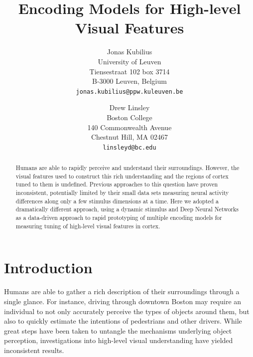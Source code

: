 \documentclass[10pt,twocolumn,letterpaper]{article}
\begin{document}
\title{Encoding Models for High-level Visual Features}

\author{Jonas Kubilius\\
University of Leuven\\
Tiensestraat 102 box 3714\\
B-3000 Leuven, Belgium\\
{\tt\small jonas.kubilius@ppw.kuleuven.be}
\and
Drew Linsley\\
Boston College\\
140 Commonwealth Avenue\\
Chestnut Hill, MA 02467\\
{\tt\small linsleyd@bc.edu}
}

\maketitle

\begin{abstract}
   Humans are able to rapidly perceive and understand their surroundings. However, the visual features used to construct this rich understanding and the regions of cortex tuned to them is undefined. Previous approaches to this question have proven inconsistent, potentially limited by their small data sets measuring neural activity differences along only a few stimulus dimensions at a time. Here we adopted a dramatically different approach, using a dynamic stimulus and Deep Neural Networks as a data-driven approach to rapid prototyping of multiple encoding models for measuring tuning of high-level visual features in cortex.
\end{abstract}

\section{Introduction}

Humans are able to gather a rich description of their surroundings through a single glance. For instance, driving through downtown Boston may require an individual to not only accurately perceive the types of objects around them, but also to quickly estimate the intentions of pedestrians and other drivers. While great steps have been taken to untangle the mechanisms underlying object perception, investigations into high-level visual understanding have yielded inconsistent results.
\end{document}
